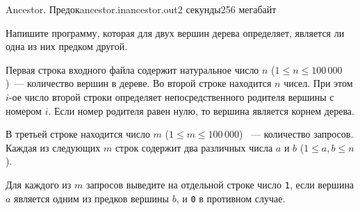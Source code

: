 \begin{problem}{Ancestor. Предок}{ancestor.in}{ancestor.out}{2 секунды}{256 мегабайт}

Напишите программу, которая для двух вершин дерева определяет, является ли одна из
них предком другой.

\InputFile

Первая строка входного файла содержит натуральное число $n$ ($1 \le n \le 100\,000$)~---
количество вершин в дереве.
Во второй строке находится $n$ чисел. При этом $i$-ое число второй строки
определяет непосредственного родителя вершины с номером $i$. Если номер родителя
равен нулю, то вершина является корнем дерева.

В третьей строке находится число $m$ ($1 \le m \le 100\,000$) ~--- количество запросов.
Каждая из следующих $m$ строк содержит два различных числа $a$ и $b$ ($1 \le a, b \le n$).

\OutputFile

Для каждого из $m$ запросов выведите на отдельной строке число \texttt{1}, если вершина $a$
является одним из предков вершины $b$, и \texttt{0} в противном случае.

\Example

\begin{example}
%
\end{example}

\end{problem}
